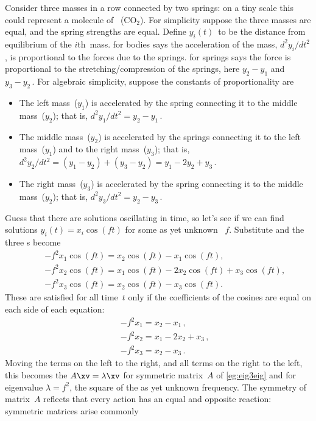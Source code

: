 \begin{example} \label{eg:eig3vib}
Consider three masses in a row connected by two springs: on a tiny scale this could represent a molecule of ~(\(\text{CO}_2\)).
For simplicity suppose the three masses are equal, and the spring strengths are equal.
Define \(y_i(t)\)~to be the distance from equilibrium of the \(i\)th~mass.
 for bodies says the acceleration of the mass, \(d^2y_i/dt^2\), is proportional to the forces due to the springs.
 for springs says the force is proportional to the stretching\slash compression of the springs, here \(y_2-y_1\) and \(y_3-y_2\)\,.
For algebraic simplicity, suppose the constants of proportionality are 
\begin{itemize}
\item The left mass~(\(y_1\)) is accelerated by the spring connecting it to the middle mass~(\(y_2\)); that is, \(d^2y_1/dt^2=y_2-y_1\)\,.
\item The middle mass~(\(y_2\)) is accelerated by the springs connecting it to the left mass~(\(y_1\)) and to the right mass~(\(y_3\)); that is, \(d^2y_2/dt^2=(y_1-y_2)+(y_3-y_2)=y_1-2y_2+y_3\)\,.
\item The right mass~(\(y_3\)) is accelerated by the spring connecting it to the middle mass~(\(y_2\)); that is, \(d^2y_3/dt^2=y_2-y_3\)\,.
\end{itemize}
Guess that there are solutions oscillating in time, so let's see if we can find solutions \(y_i(t)=x_i\cos(ft)\) for some as yet unknown ~\(f\).
Substitute and the three s become
\begin{eqnarray*}
&&-f^2x_1\cos(ft)=x_2\cos(ft)-x_1\cos(ft),
\\&&-f^2x_2\cos(ft)=x_1\cos(ft)-2x_2\cos(ft)+x_3\cos(ft),
\\&&-f^2x_3\cos(ft)=x_2\cos(ft)-x_3\cos(ft).
\end{eqnarray*}
These are satisfied for all time~\(t\) only if the coefficients of the cosines are equal on each side of each equation:
\begin{eqnarray*}
&&-f^2x_1=x_2-x_1\,,
\\&&-f^2x_2=x_1-2x_2+x_3\,,
\\&&-f^2x_3=x_2-x_3\,.
\end{eqnarray*}
Moving the terms on the left to the right, and all terms on the right to the left, this becomes the  \(A\xv=\lambda\xv\) for symmetric matrix~\(A\) of \cref{eg:eig3eig} and for eigenvalue \(\lambda=f^2\), the square of the as yet unknown frequency.
The symmetry of matrix~\(A\) reflects  that every action has an equal and opposite reaction: symmetric matrices arise commonly 


\end{example}
